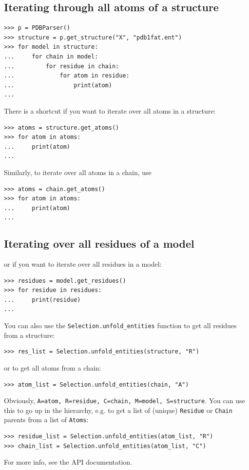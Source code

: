 \subsection*{Iterating through all atoms of a structure}

\begin{verbatim}
>>> p = PDBParser()
>>> structure = p.get_structure("X", "pdb1fat.ent")
>>> for model in structure:
...     for chain in model:
...         for residue in chain:
...             for atom in residue:
...                 print(atom)
...
\end{verbatim}

There is a shortcut if you want to iterate over all atoms in a structure:
\begin{verbatim}
>>> atoms = structure.get_atoms()
>>> for atom in atoms:
...     print(atom)
...
\end{verbatim}

Similarly, to iterate over all atoms in a chain, use
\begin{verbatim}
>>> atoms = chain.get_atoms()
>>> for atom in atoms:
...     print(atom)
...
\end{verbatim}

\subsection*{Iterating over all residues of a model}

or if you want to iterate over all residues in a model:
\begin{verbatim}
>>> residues = model.get_residues()
>>> for residue in residues:
...     print(residue)
...
\end{verbatim}

You can also use the \verb+Selection.unfold_entities+ function to get all residues from a structure:
\begin{verbatim}
>>> res_list = Selection.unfold_entities(structure, "R")
\end{verbatim}
or to get all atoms from a chain:
\begin{verbatim}
>>> atom_list = Selection.unfold_entities(chain, "A")
\end{verbatim}
Obviously, \verb+A=atom, R=residue, C=chain, M=model, S=structure+.
You can use this to go up in the hierarchy, e.g. to get a list of
(unique) \verb+Residue+ or \verb+Chain+ parents from a list of
\verb+Atoms+:

\begin{verbatim}
>>> residue_list = Selection.unfold_entities(atom_list, "R")
>>> chain_list = Selection.unfold_entities(atom_list, "C")
\end{verbatim}
For more info, see the API documentation.

